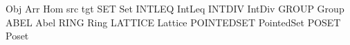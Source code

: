 \def\cat#1{{\mathsfmbf {#1}}}
\def\one{{\mathit 1}}
\def\oneof#1{{\one_{#1}}}
\DefOpP Obj
\DefOpP Arr
\DefOp Hom
\DefOp src
\DefOp tgt
\DefCAT SET         Set
\DefCAT INTLEQ      IntLeq
\DefCAT INTDIV      IntDiv
\DefCAT GROUP       Group
\DefCAT ABEL        Abel
\DefCAT RING        Ring
\DefCAT LATTICE     Lattice
\DefCAT POINTEDSET  PointedSet
\DefCAT POSET       Poset

\let\bottom=\bot
\def\smallcovby{\mathrel{-\mkern-8mu\Yleft}}
\def\covby{\mathrel{-\mkern-9mu<}}
\def\wellbelow{\mathrel{\ll}}
\let\wbelow=\wellbelow
\def\incomparable{\doublemidrel}
\def\altincomparable{\mathrel{\rangle\mkern-5mu\langle}}
\let\incomp=\incomparable
\def\embto{\mathrel{\hookrightarrow}}
\def\embijto{\hookrightarrow\mathrel{\mkern-15mu}\rightarrow}
\def\dmnd{\mathbin{\diamond}}
\def\join{\mathbin{\vee}}
\def\meet{\mathbin{\wedge}}
\def\Join{\bigvee}
\def\Meet{\bigwedge}
\def\downsets#1{\cal O(#1)}
\let\downs=\downsets
\def\down{\mathord{\downarrow}}
\def\up{\mathord{\uparrow}}
\def\dualposet#1{{#1}^\partial}
\let\dual=\dualposet
\def\ubs#1{{#1}^{\mathrmtiny{U}}}
\def\lbs#1{{#1}^{\mathrmtiny{L}}}
\def\lub{\namedop{lub}}
\def\glb{\namedop{glb}}
\def\fixpoints{\namedop{Fix}}
\def\lfp{\namedop{lfp}}
\def\gfp{\namedop{gfp}}
\def\lift#1{#1_{\bot}}
\def\posetplus{\oplus}
\def\posetunion{\uplus}
\def\ordplus{\oplus}
\def\ordinal#1{\mathbf{#1}}
\let\ordnum=\ordinal
\def\flatnum#1{\overline{\mathbf{#1}}}

